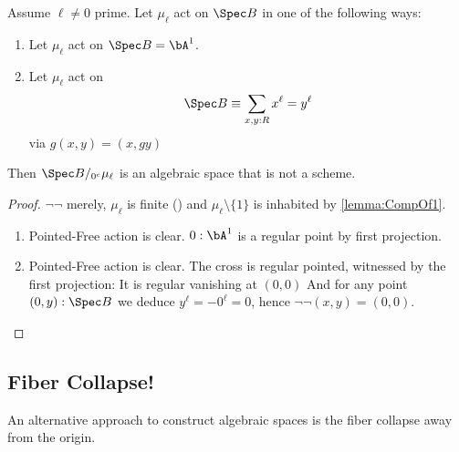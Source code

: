 \begin{example}
	Assume $\ell \neq 0$ prime. Let $\mu_\ell$ act on $\Spec B$ in one of the following ways:
	\begin{enumerate}
		\item Let $\mu_\ell$ act on $\Spec B = \bA^1$. 
		\item Let $\mu_\ell$ act on
		\[
		\Spec B \equiv \sum_{x , y : R} x^\ell = y^\ell
		\]
		via $g (x,y) = (x,g y)$
	\end{enumerate}
	Then $\Spec B /_{0^c} \mu_\ell$ is an algebraic space that is not a scheme.
\end{example}
\begin{proof}
	$\lnot \lnot$ merely, $\mu_\ell$ is finite (\todocite) and $\mu_\ell \setminus \{1\}$ is inhabited by \ref{lemma:CompOf1}. 
	\begin{enumerate}
		\item Pointed-Free action is clear. $0 : \bA^1$ is a regular point by first projection.
		\item  Pointed-Free action is clear. The cross is regular pointed, witnessed by  the first projection: It is regular vanishing at $(0,0)$ And for any point $(0,y) : \Spec B$ we deduce $y^\ell = -0^\ell = 0$, hence $\lnot \lnot (x,y) = (0,0)$.
	\end{enumerate}
\end{proof}
\subsection{Fiber Collapse!}
An alternative approach to construct algebraic spaces is the fiber collapse away from the origin.

